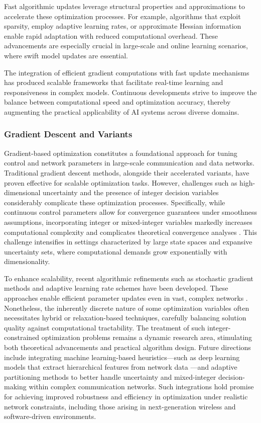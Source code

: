\documentclass[sigconf]{acmart}
\begin{document}
Fast algorithmic updates leverage structural properties and approximations to accelerate these optimization processes. For example, algorithms that exploit sparsity, employ adaptive learning rates, or approximate Hessian information enable rapid adaptation with reduced computational overhead. These advancements are especially crucial in large-scale and online learning scenarios, where swift model updates are essential.

The integration of efficient gradient computations with fast update mechanisms has produced scalable frameworks that facilitate real-time learning and responsiveness in complex models. Continuous developments strive to improve the balance between computational speed and optimization accuracy, thereby augmenting the practical applicability of AI systems across diverse domains.

\subsubsection{Gradient Descent and Variants}

Gradient-based optimization constitutes a foundational approach for tuning control and network parameters in large-scale communication and data networks. Traditional gradient descent methods, alongside their accelerated variants, have proven effective for scalable optimization tasks. However, challenges such as high-dimensional uncertainty and the presence of integer decision variables considerably complicate these optimization processes. Specifically, while continuous control parameters allow for convergence guarantees under smoothness assumptions, incorporating integer or mixed-integer variables markedly increases computational complexity and complicates theoretical convergence analyses \cite{ref36}. This challenge intensifies in settings characterized by large state spaces and expansive uncertainty sets, where computational demands grow exponentially with dimensionality.

To enhance scalability, recent algorithmic refinements such as stochastic gradient methods and adaptive learning rate schemes have been developed. These approaches enable efficient parameter updates even in vast, complex networks \cite{ref1,ref9,ref10,ref11,ref12,ref14,ref16}. Nonetheless, the inherently discrete nature of some optimization variables often necessitates hybrid or relaxation-based techniques, carefully balancing solution quality against computational tractability. The treatment of such integer-constrained optimization problems remains a dynamic research area, stimulating both theoretical advancements and practical algorithm design. Future directions include integrating machine learning-based heuristics—such as deep learning models that extract hierarchical features from network data \cite{ref16}—and adaptive partitioning methods \cite{ref36} to better handle uncertainty and mixed-integer decision-making within complex communication networks. Such integrations hold promise for achieving improved robustness and efficiency in optimization under realistic network constraints, including those arising in next-generation wireless and software-driven environments.
\end{document}

